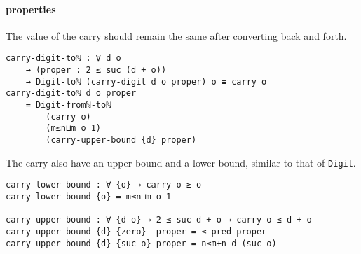 \documentclass[../thesis.tex]{subfiles}
\begin{document}
\paragraph{properties}

The value of the carry should remain the same after converting back and forth.

\begin{lstlisting}
carry-digit-toℕ : ∀ d o
    → (proper : 2 ≤ suc (d + o))
    → Digit-toℕ (carry-digit d o proper) o ≡ carry o
carry-digit-toℕ d o proper
    = Digit-fromℕ-toℕ
        (carry o)
        (m≤n⊔m o 1)
        (carry-upper-bound {d} proper)
\end{lstlisting}

The carry also have an upper-bound and a lower-bound, similar to that of {\lstinline|Digit|}.

\begin{lstlisting}
carry-lower-bound : ∀ {o} → carry o ≥ o
carry-lower-bound {o} = m≤n⊔m o 1

carry-upper-bound : ∀ {d o} → 2 ≤ suc d + o → carry o ≤ d + o
carry-upper-bound {d} {zero}  proper = ≤-pred proper
carry-upper-bound {d} {suc o} proper = n≤m+n d (suc o)
\end{lstlisting}













%
\end{document}

